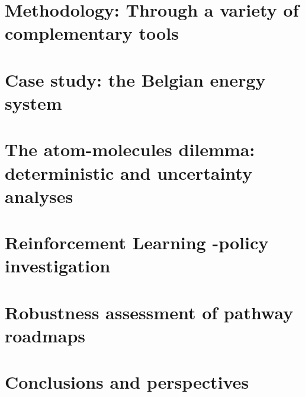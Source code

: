 \documentclass[a4paper,twoside,10pt,final]{memoir} %
\begin{document}
\chapter{Methodology: Through a variety of complementary tools}
\label{chap:chap_methodo}

\clearpage


\clearemptydoublepage
\chapter{Case study: the Belgian energy system} 
\label{chap:case_study}

\clearpage


\clearemptydoublepage
\chapter{The atom-molecules dilemma: deterministic and uncertainty analyses} 
\label{chap:atom_mol}

\clearpage

%
\clearemptydoublepage
\chapter{Reinforcement Learning -policy investigation}
\label{chap:chap_RL}

\clearpage

\clearemptydoublepage
\chapter{Robustness assessment of pathway roadmaps}
\label{chap:chap_RobPol}

\clearpage

\clearemptydoublepage
\chapter*{Conclusions and perspectives} 

\clearpage

\clearemptydoublepage

\end{document}
